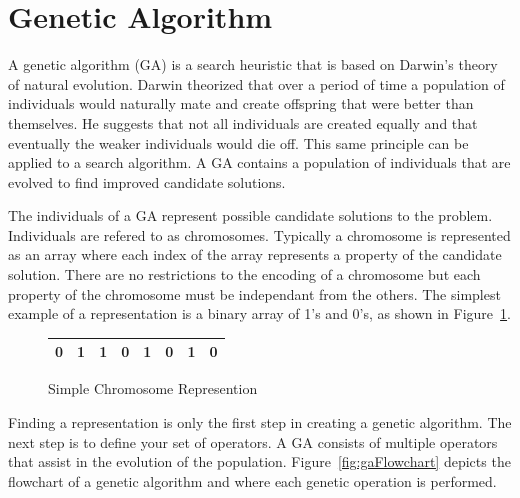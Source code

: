 \section{Genetic Algorithm}

A genetic algorithm (GA) is a search heuristic that is based on Darwin's theory of natural evolution. Darwin theorized that over a period of time a population of individuals would naturally mate and create offspring that were better than themselves. He suggests that not all individuals are created equally and that eventually the weaker individuals would die off. This same principle can be applied to a search algorithm. A GA contains a population of individuals that are evolved to find improved candidate solutions.

The individuals of a GA represent possible candidate solutions to the problem. Individuals are refered to as chromosomes. Typically a chromosome is represented as an array where each index of the array represents a property of the candidate solution. There are no restrictions to the encoding of a chromosome but each property of the chromosome must be independant from the others. The simplest example of a representation is a binary array of 1's and 0's, as shown in Figure~\ref{fig:sampleChromosome}.

\begin{figure}[H]
  \label{fig:sampleChromosome}
  \centering
  \begin{tabular}{ | l | l | l | l | l | l | l | l | }
    \hline
    0 & 1 & 1 & 0 & 1 & 0 & 1 & 0 \\
    \hline
  \end{tabular}
  \caption{Simple Chromosome Represention}
\end{figure}

Finding a representation is only the first step in creating a genetic algorithm. The next step is to define your set of operators. A GA consists of multiple operators that assist in the evolution of the population. Figure~\ref{fig:gaFlowchart} depicts the flowchart of a genetic algorithm and where each genetic operation is performed.

